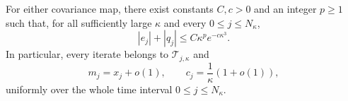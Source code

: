 \begin{lemma}
\label{lem:discrete-shadowing}
For either covariance map, there exist constants $C,c>0$ and an integer $p\geq1$ such that,
for all sufficiently large $\kappa$ and every $0\leq j\leq N_\kappa$,
\begin{equation}
\label{eq:shadowing-estimate}
    |e_j|+|q_j|
    \leq C\kappa^p e^{-c\kappa^3}.
\end{equation}
In particular, every iterate belongs to $\mathcal T_{j,\kappa}$ and
\begin{equation}
\label{eq:shadowing-conclusion}
    m_j=x_j+o(1),
    \qquad
    c_j=\frac1\kappa(1+o(1)),
\end{equation}
uniformly over the whole time interval $0\leq j\leq N_\kappa$.
\end{lemma}

